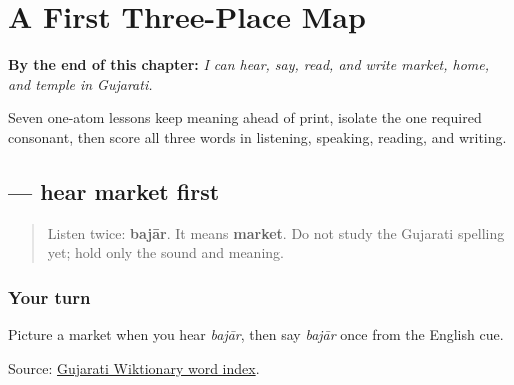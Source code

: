 
\chapter{A First Three-Place Map}
\label{ch:gu-first-three-places}

\begin{chapteropening}
\textbf{By the end of this chapter:} \emph{I can hear, say, read, and write market, home, and temple in Gujarati.}

Seven one-atom lessons keep meaning ahead of print, isolate the one required consonant, then score all three words in listening, speaking, reading, and writing.
\end{chapteropening}

\section[\texorpdfstring{\gu{બજાર} (bajār)}{બજાર (bajār)}]{ — hear market first}

\label{lesson:GU-C20-hear-bajar}



\begin{quote}
Listen twice: \textbf{bajār}. It means \textbf{market}. Do not study the Gujarati spelling yet; hold only the sound and meaning.
\end{quote}

\subsection*{Your turn}
Picture a market when you hear \emph{bajār}, then say \emph{bajār} once from the English cue.

\begin{tcolorbox}[breakable,colback=teal!4,colframe=teal!35!black,title={Before you move on}]
Source: \href{https://gu.wiktionary.org/wiki/\%E0\%AA\%B5\%E0\%AA\%BF\%E0\%AA\%95\%E0\%AA\%BF\%E0\%AA\%95\%E0\%AB\%8B\%E0\%AA\%B6:\%E0\%AA\%B6\%E0\%AA\%AC\%E0\%AB\%8D\%E0\%AA\%A6\_\%E0\%AA\%85\%E0\%AA\%A8\%E0\%AB\%81\%E0\%AA\%95\%E0\%AB\%8D\%E0\%AA\%B0\%E0\%AA\%AE\%E0\%AA\%A3\%E0\%AA\%BF\%E0\%AA\%95\%E0\%AA\%BE}{Gujarati Wiktionary word index}.
\end{tcolorbox}
